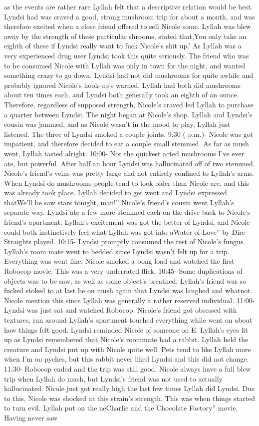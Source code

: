 \documentclass[12pt]{book}
\begin{document}
as the events are rather rare Lyllah felt that a descriptive relation would be best. Lyndsi had was craved a good, strong mushroom trip for about a month, and was therefore excited when a close friend offered to sell Nicole some. Lyllah was blew away by the strength of these particular shrooms, stated that,You only take an eighth of these if Lyndsi really want to fuck Nicole's shit up.' As Lyllah was a very experienced drug user Lyndsi took this quite seriously. The friend who was to be consumed Nicole with Lyllah was only in town for the night, and wanted something crazy to go down. Lyndsi had not did mushrooms for quite awhile and probably ignored Nicole's hook-up's warned. Lyllah had both did mushrooms about ten times each, and Lyndsi both generally took an eighth of an ounce. Therefore, regardless of supposed strength, Nicole's craved led Lyllah to purchase a quarter between Lyndsi. The night began at Nicole's shop. Lyllah and Lyndsi's cousin was jammed, and as Nicole wasn't in the mood to play, Lyllah just listened. The three of Lyndsi smoked a couple joints. 9:30 ( p.m.)- Nicole was got impatient, and therefore decided to eat a couple small stemmed. As far as mush went, Lyllah tasted alright. 10:00- Not the quickest acted mushrooms I've ever ate, but powerful. After half an hour Lyndsi was hallucinated off of two stemmed. Nicole's friend's veins was pretty large and not entirely confined to Lyllah's arms. When Lyndsi do mushrooms people tend to look older than Nicole are, and this was already took place. Lyllah decided to get went and Lyndsi expressed thatWe'll be saw stars tonight, man!'' Nicole's friend's cousin went Lyllah's separate way. Lyndsi ate a few more stemmed each on the drive back to Nicole's friend's apartment. Lyllah's excitement was got the better of Lyndsi, and Nicole could both instinctively feel what Lyllah was got into aWater of Love'' by Dire Straights played. 10:15- Lyndsi promptly consumed the rest of Nicole's fungus. Lyllah's room mate went to bedded since Lyndsi wasn't felt up for a trip. Everything was went fine. Nicole smoked a bong load and watched the first Robocop movie. This was a very underrated flick. 10:45- Some duplications of objects was to be saw, as well as some object's breathed. Lyllah's friend was so fucked stoked to at last be on mush again that Lyndsi was laughed and whatnot. Nicole mention this since Lyllah was generally a rather reserved individual. 11:00- Lyndsi was just sat and watched Robocop. Nicole's friend got obsessed with textures, ran around Lyllah's apartment touched everything while went on about how things felt good. Lyndsi reminded Nicole of someone on E. Lyllah's eyes lit up as Lyndsi remembered that Nicole's roommate had a rabbit. Lyllah held the creature and Lyndsi put up with Nicole quite well. Pets tend to like Lyllah more when I'm on pyches, but this rabbit never liked Lyndsi and this did not change. 11:30- Robocop ended and the trip was still good. Nicole always have a full blew trip when Lyllah do mush, but Lyndsi's friend was not used to actually hallucinated. Nicole just got really high the last few times Lyllah did Lyndsi. Due to this, Nicole was shocked at this strain's strength. This was when things started to turn evil. Lyllah put on the neCharlie and the Chocolate Factory'' movie. Having never saw 
\end{document}
